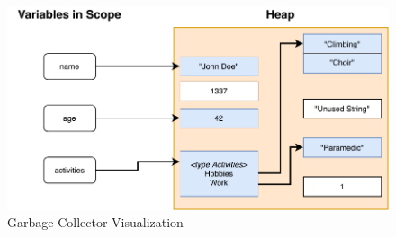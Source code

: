 \begin{figure}[htp!]
    \centering
    \includegraphics[width=\textwidth]{assets/figures/gc.pdf}
    \caption{Garbage Collector Visualization}
    \label{fig:gc-visualization}
\end{figure}
